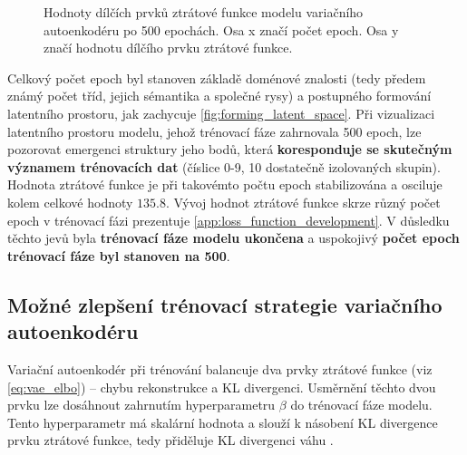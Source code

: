 \begin{figure}[H]
    \centering
    \qquad
    \caption{Hodnoty dílčích prvků ztrátové funkce modelu variačního autoenkodéru po 500 epochách. Osa x značí počet epoch. Osa y značí hodnotu dílčího prvku ztrátové funkce.}
    \label{fig:vae_model_loss_function_terms_converence}
\end{figure}

Celkový počet epoch byl stanoven základě doménové znalosti (tedy předem známý počet tříd, jejich sémantika a společné rysy) a postupného formování latentního prostoru, jak zachycuje \autoref{fig:forming_latent_space}.
Při vizualizaci latentního prostoru modelu, jehož trénovací fáze zahrnovala 500 epoch, lze pozorovat emergenci struktury jeho bodů, která \textbf{koresponduje se skutečným významem trénovacích dat} (číslice 0-9, 10 dostatečně izolovaných skupin).
Hodnota ztrátové funkce je při takovémto počtu epoch stabilizována a osciluje kolem celkové hodnoty $135.8$. Vývoj hodnot ztrátové funkce skrze různý počet epoch v trénovací fázi prezentuje \autoref{app:loss_function_development}.
V důsledku těchto jevů byla \textbf{trénovací fáze modelu ukončena} a uspokojivý \textbf{počet epoch trénovací fáze byl stanoven na 500}.

\subsection{Možné zlepšení trénovací strategie variačního autoenkodéru}
Variační autoenkodér při trénování balancuje dva prvky ztrátové funkce (viz \autoref{eq:vae_elbo}) – chybu rekonstrukce a KL divergenci.
Usměrnění těchto dvou prvku lze dosáhnout zahrnutím hyperparametru $\beta$ do trénovací fáze modelu. 
Tento hyperparametr má skalární hodnota a slouží k násobení KL divergence prvku ztrátové funkce, tedy přiděluje KL divergenci váhu \cite{Higgins2022}.

